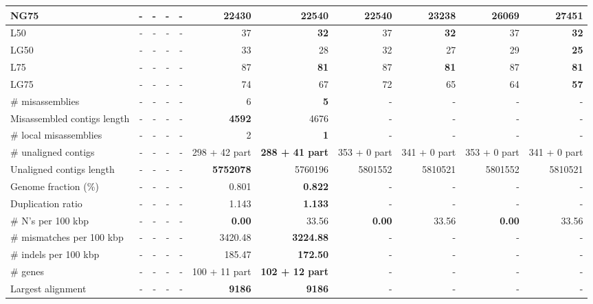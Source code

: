 \documentclass[12pt,a4paper]{article}
\begin{document}
\begin{table}[ht]
\begin{center}
\begin{tabular}{|l*{10}{|r}|}
NG75 & - & - & - & - & 22430 & 22540 & 22540 & 23238 & 26069 & {\bf 27451} \\ \hline
L50 & - & - & - & - & 37 & {\bf 32} & 37 & {\bf 32} & 37 & {\bf 32} \\ \hline
LG50 & - & - & - & - & 33 & 28 & 32 & 27 & 29 & {\bf 25} \\ \hline
L75 & - & - & - & - & 87 & {\bf 81} & 87 & {\bf 81} & 87 & {\bf 81} \\ \hline
LG75 & - & - & - & - & 74 & 67 & 72 & 65 & 64 & {\bf 57} \\ \hline
\# misassemblies & - & - & - & - & 6 & {\bf 5} & - & - & - & - \\ \hline
Misassembled contigs length & - & - & - & - & {\bf 4592} & 4676 & - & - & - & - \\ \hline
\# local misassemblies & - & - & - & - & 2 & {\bf 1} & - & - & - & - \\ \hline
\# unaligned contigs & - & - & - & - & 298 + 42 part & {\bf 288 + 41 part} & 353 + 0 part & 341 + 0 part & 353 + 0 part & 341 + 0 part \\ \hline
Unaligned contigs length & - & - & - & - & {\bf 5752078} & 5760196 & 5801552 & 5810521 & 5801552 & 5810521 \\ \hline
Genome fraction (\%) & - & - & - & - & 0.801 & {\bf 0.822} & - & - & - & - \\ \hline
Duplication ratio & - & - & - & - & 1.143 & {\bf 1.133} & - & - & - & - \\ \hline
\# N's per 100 kbp & - & - & - & - & {\bf 0.00} & 33.56 & {\bf 0.00} & 33.56 & {\bf 0.00} & 33.56 \\ \hline
\# mismatches per 100 kbp & - & - & - & - & 3420.48 & {\bf 3224.88} & - & - & - & - \\ \hline
\# indels per 100 kbp & - & - & - & - & 185.47 & {\bf 172.50} & - & - & - & - \\ \hline
\# genes & - & - & - & - & 100 + 11 part & {\bf 102 + 12 part} & - & - & - & - \\ \hline
Largest alignment & - & - & - & - & {\bf 9186} & {\bf 9186} & - & - & - & - \\ \hline
\end{tabular}
\end{center}
\end{table}
\end{document}

